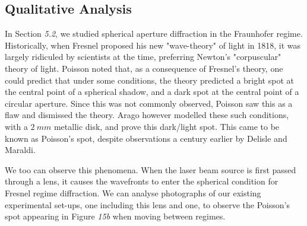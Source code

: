 \documentclass[a4paper]{article}
\begin{document}
\subsection{Qualitative Analysis}
In Section \emph{5.2}, we studied spherical aperture diffraction in the Fraunhofer regime. Historically, when Fresnel proposed his new "wave-theory" of light in 1818, it was largely ridiculed by scientists at the time, preferring Newton's "corpuscular" theory of light. Poisson noted that, as a consequence of Fresnel's theory, one could predict that under some conditions, the theory predicted a bright spot at the central point of a spherical shadow, and a dark spot at the central point of a circular aperture. Since this was not commonly observed, Poisson saw this as a flaw and dismissed the theory. Arago however modelled these such conditions, with a $2\ mm$ metallic disk, and prove this dark/light spot. This came to be known as Poisson's spot, despite observations a century earlier by Delisle and Maraldi. 

We too can observe this phenomena. When the laser beam source is first passed through a lens, it causes the wavefronts to enter the spherical condition for Fresnel regime diffraction. We can analyse photographs of our existing experimental set-ups, one including this lens and one, to observe the Poisson's spot appearing in Figure \emph{15b} when moving between regimes.
\end{document}
